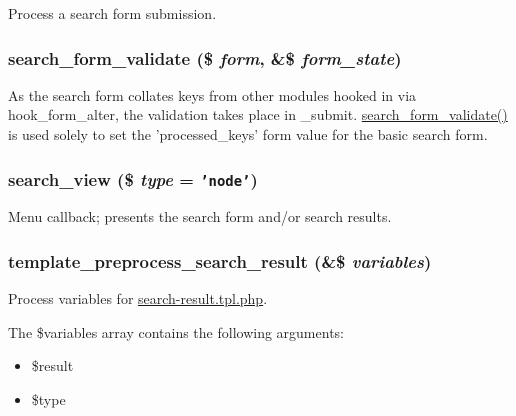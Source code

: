 Process a search form submission. \hypertarget{search_8pages_8inc_9b4ec561b0b5121050f68541e7047a6d}{
\subsubsection[{search\_\-form\_\-validate}]{\setlength{\rightskip}{0pt plus 5cm}search\_\-form\_\-validate (\$ {\em form}, \/  \&\$ {\em form\_\-state})}}
\label{search_8pages_8inc_9b4ec561b0b5121050f68541e7047a6d}


As the search form collates keys from other modules hooked in via hook\_\-form\_\-alter, the validation takes place in \_\-submit. \hyperlink{search_8pages_8inc_9b4ec561b0b5121050f68541e7047a6d}{search\_\-form\_\-validate()} is used solely to set the 'processed\_\-keys' form value for the basic search form. \hypertarget{search_8pages_8inc_3f9e1f2fb608388509992625d8da3fc4}{
\subsubsection[{search\_\-view}]{\setlength{\rightskip}{0pt plus 5cm}search\_\-view (\$ {\em type} = {\tt 'node'})}}
\label{search_8pages_8inc_3f9e1f2fb608388509992625d8da3fc4}


Menu callback; presents the search form and/or search results. \hypertarget{search_8pages_8inc_45d5ee9444aba311056f3949e503b426}{
\subsubsection[{template\_\-preprocess\_\-search\_\-result}]{\setlength{\rightskip}{0pt plus 5cm}template\_\-preprocess\_\-search\_\-result (\&\$ {\em variables})}}
\label{search_8pages_8inc_45d5ee9444aba311056f3949e503b426}


Process variables for \hyperlink{search-result_8tpl_8php}{search-result.tpl.php}.

The \$variables array contains the following arguments:\begin{itemize}
\item \$result\item \$type\end{itemize}


